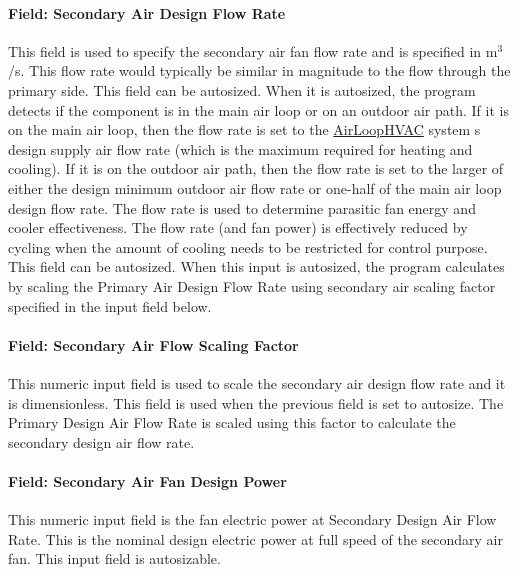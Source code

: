\paragraph{Field: Secondary Air Design Flow Rate}\label{field-secondary-air-design-flow-rate}

This field is used to specify the secondary air fan flow rate and is specified in m\(^{3}\)/s. This flow rate would typically be similar in magnitude to the flow through the primary side. This field can be autosized. When it is autosized, the program detects if the component is in the main air loop or on an outdoor air path. If it is on the main air loop, then the flow rate is set to the \hyperref[airloophvac]{AirLoopHVAC} system s design supply air flow rate (which is the maximum required for heating and cooling). If it is on the outdoor air path, then the flow rate is set to the larger of either the design minimum outdoor air flow rate or one-half of the main air loop design flow rate. The flow rate is used to determine parasitic fan energy and cooler effectiveness. The flow rate (and fan power) is effectively reduced by cycling when the amount of cooling needs to be restricted for control purpose. This field can be autosized. When this input is autosized, the program calculates by scaling the Primary Air Design Flow Rate using secondary air scaling factor specified in the input field below.

\paragraph{Field: Secondary Air Flow Scaling Factor}\label{field-secondary-air-flow-scaling-factor}

This numeric input field is used to scale the secondary air design flow rate and it is dimensionless. This field is used when the previous field is set to autosize. The Primary Design Air Flow Rate is scaled using this factor to calculate the secondary design air flow rate.

\paragraph{Field: Secondary Air Fan Design Power}\label{field-secondary-air-fan-design-power}

This numeric input field is the fan electric power at Secondary Design Air Flow Rate. This is the nominal design electric power at full speed of the secondary air fan. This input field is autosizable.

